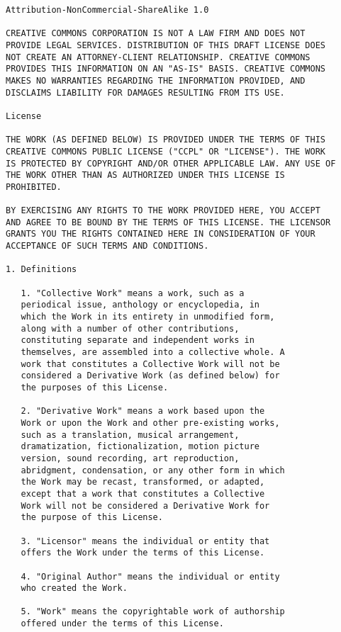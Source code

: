 \begin{verbatim}
Attribution-NonCommercial-ShareAlike 1.0

CREATIVE COMMONS CORPORATION IS NOT A LAW FIRM AND DOES NOT
PROVIDE LEGAL SERVICES. DISTRIBUTION OF THIS DRAFT LICENSE DOES
NOT CREATE AN ATTORNEY-CLIENT RELATIONSHIP. CREATIVE COMMONS
PROVIDES THIS INFORMATION ON AN "AS-IS" BASIS. CREATIVE COMMONS
MAKES NO WARRANTIES REGARDING THE INFORMATION PROVIDED, AND
DISCLAIMS LIABILITY FOR DAMAGES RESULTING FROM ITS USE.

License

THE WORK (AS DEFINED BELOW) IS PROVIDED UNDER THE TERMS OF THIS
CREATIVE COMMONS PUBLIC LICENSE ("CCPL" OR "LICENSE"). THE WORK
IS PROTECTED BY COPYRIGHT AND/OR OTHER APPLICABLE LAW. ANY USE OF
THE WORK OTHER THAN AS AUTHORIZED UNDER THIS LICENSE IS
PROHIBITED.

BY EXERCISING ANY RIGHTS TO THE WORK PROVIDED HERE, YOU ACCEPT
AND AGREE TO BE BOUND BY THE TERMS OF THIS LICENSE. THE LICENSOR
GRANTS YOU THE RIGHTS CONTAINED HERE IN CONSIDERATION OF YOUR
ACCEPTANCE OF SUCH TERMS AND CONDITIONS.

1. Definitions

   1. "Collective Work" means a work, such as a
   periodical issue, anthology or encyclopedia, in
   which the Work in its entirety in unmodified form,
   along with a number of other contributions,
   constituting separate and independent works in
   themselves, are assembled into a collective whole. A
   work that constitutes a Collective Work will not be
   considered a Derivative Work (as defined below) for
   the purposes of this License.

   2. "Derivative Work" means a work based upon the
   Work or upon the Work and other pre-existing works,
   such as a translation, musical arrangement,
   dramatization, fictionalization, motion picture
   version, sound recording, art reproduction,
   abridgment, condensation, or any other form in which
   the Work may be recast, transformed, or adapted,
   except that a work that constitutes a Collective
   Work will not be considered a Derivative Work for
   the purpose of this License.

   3. "Licensor" means the individual or entity that
   offers the Work under the terms of this License.

   4. "Original Author" means the individual or entity
   who created the Work.

   5. "Work" means the copyrightable work of authorship
   offered under the terms of this License.


\end{verbatim}
